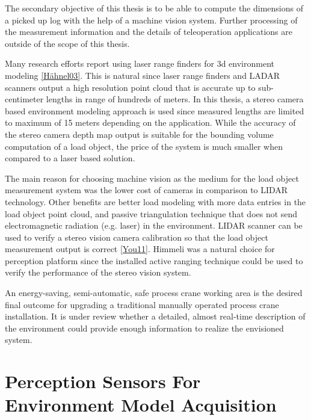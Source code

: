 \documentclass[12pt,a4paper,oneside,pdftex]{report}
\begin{document}
The secondary objective of this thesis is to be able to compute the dimensions of a picked up log with the help of a machine vision system. Further processing of the measurement information and the details of teleoperation applications are outside of the scope of this thesis.

Many research efforts report using laser range finders for 3d environment modeling \ref{Hähnel03}. This is natural since laser range finders and LADAR scanners output a high resolution point cloud that is accurate up to sub-centimeter lengths in range of hundreds of meters. In this thesis, a stereo camera based environment modeling approach is used since measured lengths are limited to maximum of 15 meters depending on the application. While the accuracy of the stereo camera depth map output is suitable for the bounding volume computation of a load object, the price of the system is much smaller when compared to a laser based solution. 

The main reason for choosing machine vision as the medium for the load object measurement system was the lower cost of cameras in comparison to LIDAR technology. Other benefits are better load modeling with more data entries in the load object point cloud, and passive triangulation technique that does not send electromagnetic radiation (e.g. laser) in the environment. LIDAR scanner can be used to verify a stereo vision camera calibration so that the load object measurement output is correct \ref{You11}. Himmeli was a natural choice for perception platform since the installed active ranging technique could be used to verify the performance of the stereo vision system.


An energy-saving, semi-automatic, safe process crane working area is the desired final outcome for upgrading a traditional manually operated process crane installation. It is under review whether a detailed, almost real-time description of the environment could provide enough information to realize the envisioned system.

\chapter{Perception Sensors For Environment Model Acquisition}
\label{chapter:perception_sensors_for_environment_model_acquisition}
\end{document}
